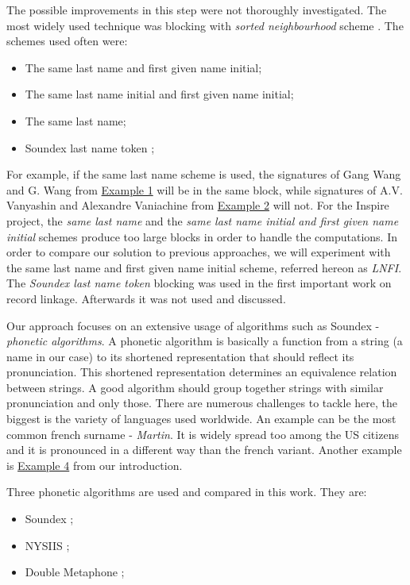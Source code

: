\documentclass{pracamgr}
\begin{document}
The possible improvements in this step were not thoroughly investigated. The most
widely used technique was blocking with \textit{sorted neighbourhood} scheme
\citep{Hernandez:1995:MPL:223784.223807}. The schemes used often were:
\begin{itemize}
\item The same last name and first given name initial;
\item The same last name initial and first given name initial;
\item The same last name;
\item Soundex last name token \citep{fellegi};
\end{itemize}
For example, if the same last name scheme is used, the signatures of Gang Wang and
G. Wang from \hyperref[ex1]{Example 1} will be in the same block, while signatures
of A.V. Vanyashin and Alexandre Vaniachine from \hyperref[ex2]{Example 2} will not.
For the Inspire project, the \textit{same last name} and the \textit{same last name initial
and first given name initial} schemes produce too large blocks in order to handle the computations.
In order to compare our solution to previous approaches, we will experiment with
the same last name and first given name initial scheme, referred hereon as \textit{LNFI}.
The \textit{Soundex last name token} blocking was used in the first important work on
record linkage. Afterwards it was not used and discussed.

Our approach focuses on an extensive usage of algorithms such as Soundex -
\textit{phonetic algorithms}. A phonetic algorithm is basically a function from a string (a
name in our case) to its shortened representation that should reflect its
pronunciation. This shortened representation
determines an equivalence relation between strings. A good algorithm should group
together strings with similar pronunciation and only those. There are numerous
challenges to tackle here, the biggest is the variety of languages used worldwide.
An example can be the most common french surname - \textit{Martin}. It is widely spread
too among the US citizens and it is pronounced in a different way than the french
variant. Another example is \hyperref[ex4]{Example 4} from our introduction.

Three phonetic algorithms are used and compared in this work. They are:
\begin{itemize}
    \item Soundex \citep{soundex}; 
    \item NYSIIS \citep{nysiis};
    \item Double Metaphone \citep{doublemetaphone};
\end{itemize}
\end{document}
